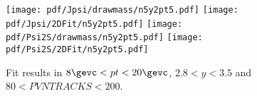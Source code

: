 \begin{figure}[H]
\begin{center}
\texttt{[image: pdf/Jpsi/drawmass/n5y2pt5.pdf]}
\texttt{[image: pdf/Jpsi/2DFit/n5y2pt5.pdf]}
\vspace*{-0.5cm}
\texttt{[image: pdf/Psi2S/drawmass/n5y2pt5.pdf]}
\texttt{[image: pdf/Psi2S/2DFit/n5y2pt5.pdf]}
\vspace*{-0.5cm}
\end{center}
\caption{Fit results in $8\gevc<pt<20\gevc$, $2.8<y<3.5$ and $80<PVNTRACKS<200$.}
\label{Fitn5y2pt5}
\end{figure}
